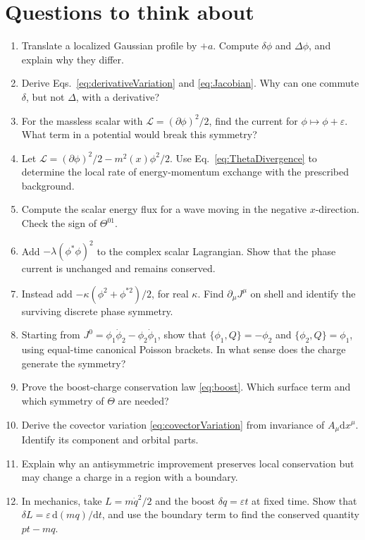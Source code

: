 \documentclass[11pt]{article}
\newcommand{\dd}{\mathrm{d}}
\newcommand{\Lag}{\mathcal{L}}
\newcommand{\Th}{\Theta}
\begin{document}
\section{Questions to think about}
\begin{enumerate}
\item Translate a localized Gaussian profile by \(+a\). Compute
\(\delta\phi\) and \(\Delta\phi\), and explain why they differ.
\item Derive Eqs.~\eqref{eq:derivativeVariation} and \eqref{eq:Jacobian}.
Why can one commute \(\delta\), but not \(\Delta\), with a derivative?
\item For the massless scalar with \(\Lag=(\partial\phi)^2/2\), find the
current for \(\phi\mapsto\phi+\varepsilon\). What term in a potential
would break this symmetry?
\item Let \(\Lag=(\partial\phi)^2/2-m^2(x)\phi^2/2\). Use
Eq.~\eqref{eq:ThetaDivergence} to determine the local rate of
energy-momentum exchange with the prescribed background.
\item Compute the scalar energy flux for a wave moving in the negative
\(x\)-direction. Check the sign of \(\Th^{01}\).
\item Add \(-\lambda(\phi^*\phi)^2\) to the complex scalar Lagrangian.
Show that the phase current is unchanged and remains conserved.
\item Instead add \(-\kappa(\phi^2+\phi^{*2})/2\), for real \(\kappa\).
Find \(\partial_\mu J^\mu\) on shell and identify the surviving discrete
phase symmetry.
\item Starting from \(J^0=\phi_1\dot\phi_2-\phi_2\dot\phi_1\), show that
\(\{\phi_1,Q\}=-\phi_2\) and \(\{\phi_2,Q\}=\phi_1\), using equal-time
canonical Poisson brackets. In what sense does the charge generate the
symmetry?
\item Prove the boost-charge conservation law \eqref{eq:boost}. Which
surface term and which symmetry of \(\Th\) are needed?
\item Derive the covector variation \eqref{eq:covectorVariation} from
invariance of \(A_\mu\dd x^\mu\). Identify its component and orbital parts.
\item Explain why an antisymmetric improvement preserves local
conservation but may change a charge in a region with a boundary.
\item In mechanics, take \(L=m\dot q^2/2\) and the boost
\(\delta q=\varepsilon t\) at fixed time. Show that
\(\delta L=\varepsilon\,\dd(mq)/\dd t\), and use the boundary term to
find the conserved quantity \(pt-mq\).
\end{enumerate}
\end{document}
